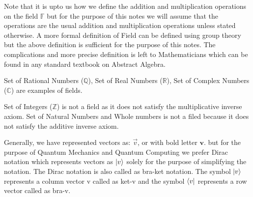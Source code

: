 Note that it is upto us how we define the addition and multiplication operations on the field $\mathbb{F}$ 
but for the purpose of this notes we will assume that the operations are the usual addition and multiplication operations unless stated otherwise.
A more formal definition of Field can be defined using group theory but the above definition is sufficient for the purpose of this notes.
The complications and more precise definition is left to Mathematicians which can be found in any standard textbook on Abstract Algebra.
\begin{example}
    Set of Rational Numbers ($\mathbb{Q}$), Set of Real Numbers ($\mathbb{R}$),
    Set of Complex Numbers ($\mathbb{C}$) are examples of fields.
\end{example}

\begin{example}
    Set of Integers ($\mathbb{Z}$) is not a field as it does not satisfy the multiplicative inverse axiom.
    Set of Natural Numbers and Whole numbers is not a filed because it does not satisfy the additive inverse axiom.
\end{example}

Generally, we have represented vectors as: $\vec{v}$, or with bold letter $\mathbf{v}$. but for the 
purpose of Quantum Mechanics and Quantum Computing we prefer Dirac notation which represents vectors as $\ket{v}$ 
solely for the purpose of simplifying the notation. The Dirac notation is also called as bra-ket notation. The 
symbol $\ket{v}$ represents a column vector v called as ket-v and the symbol $\bra{v}$ represents a 
row vector called as bra-v. 

